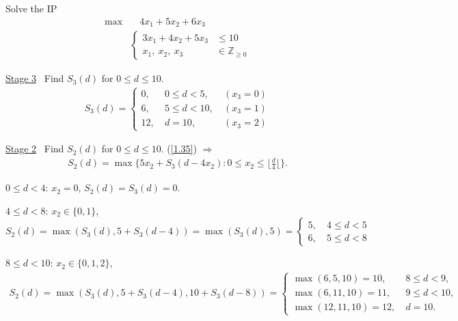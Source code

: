 \begin{example}
    Solve the IP
    \begin{align*}
        \max &\quad 4x_1 + 5x_2 + 6x_3\\
        & \left\lbrace\begin{array}{ll}
            3x_1+4x_2+5x_3&\leqslant 10 \\
            x_1,\ x_2,\ x_3 &\in\mathbb{Z}_{\geqslant 0}
        \end{array} \right.
    \end{align*}
\end{example}
\begin{solution}
    \uline{Stage 3} \ Find $S_3(d)$ for $0\leqslant d\leqslant 10$.
    \begin{align*}
        S_3(d) = \left\lbrace\begin{array}{lll}
            0, & \ 0\leqslant d<5, & \ (x_3 = 0)\\
            6, & \ 5\leqslant d<10, & \ (x_3 = 1)\\
            12, & \ d = 10, & \ (x_3 = 2)
        \end{array} \right.
    \end{align*}

    \uline{Stage 2} \ Find $S_2(d)$ for $0\leqslant d\leqslant 10$. (\ref{1.35}) $\Rightarrow$
    \begin{align*}
        S_2(d) = \max\{5x_2 + S_3(d -4x_2): 0\leqslant x_2\leqslant \lfloor\frac{d}{4}\lfloor\}. 
    \end{align*}
    
    $0\leqslant d<4$: $x_2 = 0$, $S_2(d) = S_3(d) = 0$.

    $4\leqslant d<8$: $x_2\in\{0, 1\}$, $S_2(d) = \max(S_3(d), 5+S_3(d-4)) = \max(S_3(d), 5) = \left\lbrace\begin{array}{ll}
        5, & \ 4\leqslant d<5  \\
        6, & \ 5\leqslant d<8
    \end{array} \right.$

    $8\leqslant d<10$: $x_2\in\{0, 1, 2\}$, 
    \begin{align*}
        S_2(d) = \max(S_3(d), 5+S_3(d-4), 10+S_3(d-8)) = \left\lbrace\begin{array}{ll}
        \max(6, 5, 10) = 10, & \ 8\leqslant d<9, \\
        \max(6, 11, 10) = 11, & \ 9\leqslant d< 10, \\
        \max(12, 11, 10) = 12, & \ d=10.
    \end{array} \right.
    \end{align*}


\end{solution}
